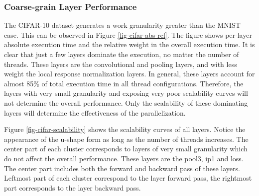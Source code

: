 \subsubsection{Coarse-grain Layer Performance}
The CIFAR-10 dataset generates a work granularity greater than 
the MNIST case. This can be observed in Figure \ref{fig-cifar-abs-rel}. 
The figure shows per-layer absolute execution time and the relative 
weight in the overall execution time. It is clear that just a few 
layers dominate the execution, no matter the number of threads. 
These layers are the convolutional and pooling layers, and with 
less weight the local response normalization layers. In general, 
these layers account for almost 85\% of total execution time in 
all thread configurations. Therefore, the layers with very small 
granularity and exposing very poor scalability curves will not 
determine the overall performance. Only the scalability of these 
dominating layers will determine the effectiveness of the 
parallelization.

Figure \ref{fig-cifar-scalability} shows the scalability curves of all layers. 
Notice the appearance of the u-shape form as long as the number of threads 
increases. The center part of each cluster corresponds to layers of very 
small granularity which do not affect the overall performance. These layers 
are the pool3, ip1 and loss. The center part includes both the forward 
and backward pass of these layers. Leftmost part of each cluster 
correspond to the layer forward pass, the rightmost part corresponds 
to the layer backward pass.

